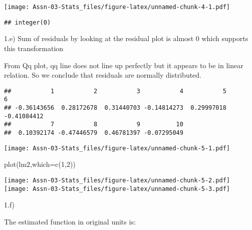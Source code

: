 \documentclass[
]{article}
\newenvironment{Shaded}{\begin{snugshade}}{\end{snugshade}}
\newcommand{\AttributeTok}[1]{\textcolor[rgb]{0.77,0.63,0.00}{#1}}
\newcommand{\DecValTok}[1]{\textcolor[rgb]{0.00,0.00,0.81}{#1}}
\newcommand{\FunctionTok}[1]{\textcolor[rgb]{0.00,0.00,0.00}{#1}}
\newcommand{\NormalTok}[1]{#1}
\newcommand{\OtherTok}[1]{\textcolor[rgb]{0.56,0.35,0.01}{#1}}
\newcommand{\SpecialCharTok}[1]{\textcolor[rgb]{0.00,0.00,0.00}{#1}}
\begin{document}
\texttt{[image: Assn-03-Stats\_files/figure-latex/unnamed-chunk-4-1.pdf]}

\begin{verbatim}
## integer(0)
\end{verbatim}

1.e) Sum of residuals by looking at the residual plot is almost 0 which
supports this transformation

From Qq plot, qq line does not line up perfectly but it appears to be in
linear relation. So we conclude that residuals are normally distributed.

\begin{Shaded}
\end{Shaded}

\begin{verbatim}
##           1           2           3           4           5           6 
## -0.36143656  0.28172678  0.31440703 -0.14814273  0.29997018 -0.41084412 
##           7           8           9          10 
##  0.10392174 -0.47446579  0.46781397 -0.07295049
\end{verbatim}

\begin{Shaded}
\end{Shaded}

\texttt{[image: Assn-03-Stats\_files/figure-latex/unnamed-chunk-5-1.pdf]}

\begin{Shaded}
\begin{Highlighting}[]
\FunctionTok{plot}\NormalTok{(lm2,}\AttributeTok{which=}\FunctionTok{c}\NormalTok{(}\DecValTok{1}\NormalTok{,}\DecValTok{2}\NormalTok{))}
\end{Highlighting}
\end{Shaded}

\texttt{[image: Assn-03-Stats\_files/figure-latex/unnamed-chunk-5-2.pdf]}
\texttt{[image: Assn-03-Stats\_files/figure-latex/unnamed-chunk-5-3.pdf]}

1.f)

The estimated function in original units is:
\end{document}
